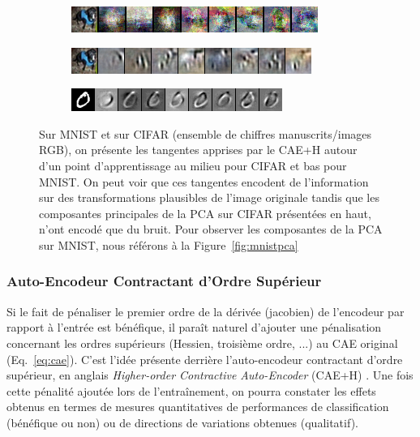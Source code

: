 \begin{figure}
\centering
\begin{subfigure}{0.9\linewidth}
\includegraphics[width=0.9\linewidth]{predoc/images/pca.png}
\label{fig:tan_pca}
\end{subfigure}

\begin{subfigure}{0.9\linewidth}
\includegraphics[width=0.9\linewidth]{predoc/images/tangents_cifar.png}
\label{fig:tan_cifar}
\end{subfigure}

\begin{subfigure}{0.9\linewidth}
\includegraphics[width=0.9\linewidth]{predoc/images/tangents_mnist.png}
\label{fig:tan_mnist}
\end{subfigure}


   \caption[Vecteur Propres du CAE+H sur MNIST et CIFAR]{ Sur MNIST et sur CIFAR (ensemble de chiffres manuscrits/images RGB), on présente les
   tangentes apprises par le CAE+H autour d'un point d'apprentissage au milieu pour CIFAR et bas pour MNIST. On peut voir que ces
   tangentes encodent de l'information sur des transformations plausibles de
   l'image originale tandis que les composantes principales de la PCA sur CIFAR présentées en haut, n'ont
   encodé que du bruit. Pour observer les composantes de la PCA sur MNIST, nous référons à la Figure~\ref{fig:mnistpca}
\label{fig:tan}}

\end{figure}

\subsubsection{Auto-Encodeur Contractant d'Ordre Supérieur}

Si le fait de pénaliser le premier ordre de la dérivée (jacobien) de l'encodeur
par rapport à l'entrée est bénéfique, il paraît naturel d'ajouter une pénalisation
concernant les ordres supérieurs (Hessien, troisième ordre, ...) au CAE
original (Eq.~\ref{eq:cae}).  C'est l'idée présente derrière l'auto-encodeur
contractant d'ordre supérieur, en anglais \textit{Higher-order Contractive
Auto-Encoder} (CAE+H) \citep{Salah+al-2011}.  Une fois cette pénalité ajoutée
lors de l'entraînement, on pourra constater les effets obtenus en termes de
mesures quantitatives de performances de classification (bénéfique ou non) ou
de directions de variations obtenues (qualitatif).

